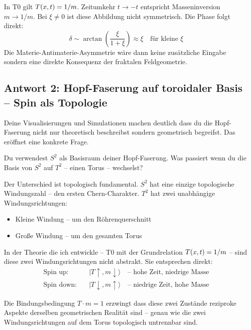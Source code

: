 In T0 gilt $T(x,t) = 1/m$. Zeitumkehr $t \to -t$ entspricht Masseninversion $m \to 1/m$. Bei $\xi \neq 0$ ist diese Abbildung nicht symmetrisch. Die Phase folgt direkt:
\begin{equation}
  \delta \sim \arctan\!\left(\frac{\xi}{1+\xi}\right) \approx \xi \quad \text{für kleine } \xi
\end{equation}
Die Materie-Antimaterie-Asymmetrie wäre dann keine zusätzliche Eingabe sondern eine direkte Konsequenz der fraktalen Feldgeometrie.

\subsection{Antwort 2: Hopf-Faserung auf toroidaler Basis -- Spin als Topologie}

\begin{response}
Deine Visualisierungen und Simulationen machen deutlich dass du die Hopf-Faserung nicht nur theoretisch beschreibst sondern geometrisch begreifst. Das eröffnet eine konkrete Frage.

Du verwendest $S^2$ als Basisraum deiner Hopf-Faserung. Was passiert wenn du die Basis von $S^2$ auf $T^2$ -- einen Torus -- wechselst?

Der Unterschied ist topologisch fundamental. $S^2$ hat eine einzige topologische Windungszahl -- den ersten Chern-Charakter. $T^2$ hat zwei unabhängige Windungsrichtungen:
\begin{itemize}[noitemsep]
  \item Kleine Windung -- um den Röhrenquerschnitt
  \item Große Windung -- um den gesamten Torus
\end{itemize}

In der Theorie die ich entwickle -- T0 mit der Grundrelation $T(x,t) = 1/m$ -- sind diese zwei Windungsrichtungen nicht abstrakt. Sie entsprechen direkt:
\begin{align}
  \text{Spin up:} \quad &|T{\uparrow}, m{\downarrow}\rangle \quad \text{-- hohe Zeit, niedrige Masse} \\
  \text{Spin down:} \quad &|T{\downarrow}, m{\uparrow}\rangle \quad \text{-- niedrige Zeit, hohe Masse}
\end{align}

Die Bindungsbedingung $T \cdot m = 1$ erzwingt dass diese zwei Zustände reziproke Aspekte derselben geometrischen Realität sind -- genau wie die zwei Windungsrichtungen auf dem Torus topologisch untrennbar sind.


\end{response}
